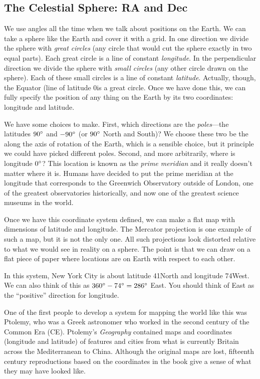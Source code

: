 \documentclass[12pt, preprint]{aastex}
\begin{document}
\subsection{The Celestial Sphere: RA and Dec}

We use angles all the time when we talk about positions on the
Earth. We can take a sphere like the Earth and cover it with a
grid. In one direction we divide the sphere with {\it great circles}
(any circle that would cut the sphere exactly in two equal
parts). Each great circle is a line of constant {\it longitude}. In
the perpendicular direction we divide the sphere with {\it small
  circles} (any other circle drawn on the sphere). Each of these small
circles is a line of constant {\it latitude}. Actually, though, the
Equator (line of latitude 0\degree is a great circle.  Once we have
done this, we can fully specify the position of any thing on the Earth
by its two coordinates: longitude and latitude.

We have some choices to make. First, which directions are the {\it
  poles}---the latitudes $90{}^\circ$ and $-90{}^\circ$ (or $90{}^\circ$
North and South)? We choose these two be the along the axis of rotation
of the Earth, which is a sensible choice, but it principle we could
have picked different poles. Second, and more arbitrarily, where is
longitude $0{}^\circ$? This location is known as the {\it prime
  meridian} and it really doesn't matter where it is. Humans have
decided to put the prime meridian at the longitude that corresponds to
the Greenwich Observatory outside of London, one of the greatest
observatories historically, and now one of the greatest science
museums in the world.

Once we have this coordinate system defined, we can make a flat map
with dimensions of latitude and longitude. The Mercator projection is
one example of such a map, but it is not the only one. All such
projections look distorted relative to what we would see in reality on
a sphere. The point is that we can draw on a flat piece of paper where
locations are on Earth with respect to each other.

In this system, New York City is about latitude 41\degree North and
longitude 74\degree West. We can also think of this as $360{}^\circ -
74{}^\circ = 286{}^\circ$ East. You should think of East as the
``positive'' direction for longitude.

One of the first people to develop a system for mapping the world like
this was Ptolemy, who was a Greek astronomer who worked in the second
century of the Common Era (CE). Ptolemy's {\it Geography} contained
maps and coordinates (longitude and latitude) of features and cities
from what is currently Britain across the Mediterranean to
China. Although the original maps are lost, fifteenth century
reproductions based on the coordinates in the book give a sense of
what they may have looked like.
\end{document}
